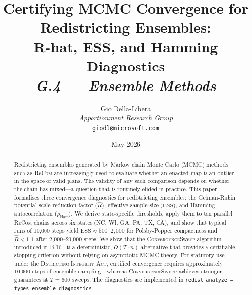 \documentclass[12pt]{article}
\title{%
  \textbf{Certifying MCMC Convergence for Redistricting Ensembles:}\\
  \textbf{R-hat, ESS, and Hamming Diagnostics}\\[0.8em]
  \normalsize\textit{G.4 --- Ensemble Methods}%
}
\author{%
  Gio Della-Libera\\
  \textit{Apportionment Research Group}\\
  \small\texttt{giodl@microsoft.com}
}
\date{May 2026}
\newcommand{\rhat}{\ensuremath{\hat{R}}}
\newcommand{\ess}{\ensuremath{\mathrm{ESS}}}
\newcommand{\ham}{\ensuremath{\rho_{\mathrm{Ham}}}}
\newcommand{\recom}{\textsc{ReCom}}
\newcommand{\cs}{\textsc{ConvergenceSweep}}
\newcommand{\dia}{\textsc{Districting Integrity Act}}
\begin{document}
\maketitle

\begin{abstract}
\noindent
Redistricting ensembles generated by Markov chain Monte Carlo (MCMC)
methods such as \recom{} are increasingly used to evaluate whether an
enacted map is an outlier in the space of valid plans.
The validity of any such comparison depends on whether the chain has
mixed---a question that is routinely elided in practice.
This paper formalises three convergence diagnostics for redistricting
ensembles: the Gelman-Rubin potential scale reduction factor ($\rhat$),
effective sample size (\ess{}), and Hamming autocorrelation ($\ham$).
We derive state-specific thresholds, apply them to ten parallel \recom{}
chains across six states (NC, WI, GA, PA, TX, CA), and show that typical
runs of 10{,}000 steps yield $\ess{} \approx 500$--$2{,}000$ for
Polsby-Popper compactness and $\rhat < 1.1$ after 2{,}000--20{,}000 steps.
We show that the \cs{} algorithm introduced in B.16~\citep{b16paper}
is a deterministic, $O(T \cdot n)$ alternative that provides a
certifiable stopping criterion without relying on asymptotic MCMC theory.
For statutory use under the \dia{}, certified convergence requires
approximately 10{,}000 steps of ensemble sampling---whereas \cs{}
achieves stronger guarantees at $T = 600$ sweeps.
The diagnostics are implemented in \texttt{redist analyze
--types ensemble-diagnostics}.
\end{abstract}

\tableofcontents
\newpage












\end{document}
